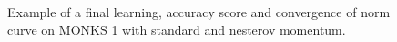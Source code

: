 \begin{appendices}
\begin{figure}[H]
\begin{subfigure}{0.40\textwidth}
                \end{subfigure}
                \begin{subfigure}{0.40\textwidth}
                    \caption{}
                    \label{fig:monks_1_NORM_SGD}
                \end{subfigure}
                \caption{Example of a final learning, accuracy score and convergence of norm curve on MONKS 1 with standard and nesterov momentum.}
                \label{fig:monks_1_SGD}
            \end{figure}


\end{appendices}
